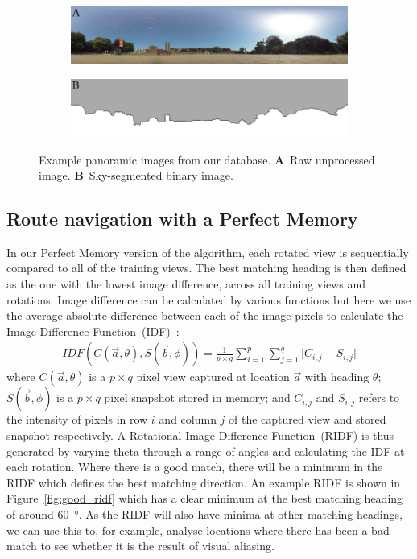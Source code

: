 \documentclass[letterpaper]{article}
\begin{document}
\begin{figure}[t]
    \centering
    \begin{subfigure}[b]{\columnwidth}
        \includegraphics[width=\columnwidth]{figures/360_240.jpg}
    \end{subfigure}
    \begin{subfigure}[b]{\columnwidth}
        \includegraphics[width=\columnwidth]{figures/360_240_mask.png}
    \end{subfigure}
    \caption{Example panoramic images from our database.
    \textbf{A}~Raw unprocessed image.
    \textbf{B}~Sky-segmented binary image.}
    \label{fig:database_images}
\end{figure}

\subsection{Route navigation with a Perfect Memory}
\label{sec:ridf_perfect_memory}
In our Perfect Memory version of the algorithm, each rotated view is sequentially compared to all of the training views. 
The best matching heading is then defined as the one with the lowest image difference, across all training views and rotations. 
Image difference can be calculated by various functions but here we use the average absolute difference between each of the image pixels to calculate the Image Difference Function~(IDF)~\citep{Zeil2003}:
%
\begin{align}
    IDF(C(\vec{a}, \theta), S(\vec{b}, \phi)) = \frac{1}{p \times q} \sum\limits_{i=1}^p{\sum\limits_{j=1}^q|{C_{i,j} - S_{i,j}|}}
\end{align}
%
where $C(\vec{a}, \theta)$ is a $p \times q$ pixel view captured at location $\vec{a}$ with heading $\theta$; $S(\vec{b}, \phi)$ is a $p \times q$ pixel snapshot stored in memory; and $C_{i,j}$ and $S_{i,j}$ refers to the intensity of pixels in row $i$ and column $j$ of the captured view and stored snapshot respectively.
A Rotational Image Difference Function~(RIDF) is thus generated by varying theta through a range of angles and calculating the IDF at each rotation. 
Where there is a good match, there will be a minimum in the RIDF which defines the best matching direction. 
An example RIDF is shown in Figure~\ref{fig:good_ridf} which has a clear minimum at the best matching heading of around \SI{60}{\degree}.
As the RIDF will also have minima at other matching headings, we can use this to, for example, analyse locations where there has been a bad match to see whether it is the result of visual aliasing.
\end{document}
